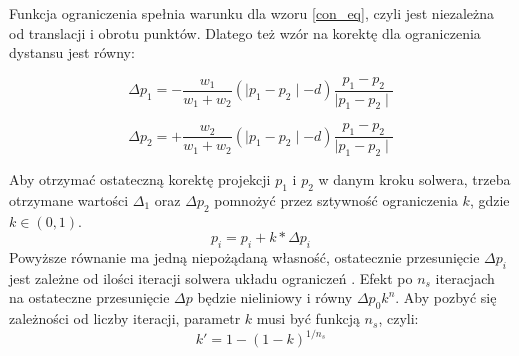 Funkcja ograniczenia spełnia warunku dla wzoru \ref{con_eq}, czyli jest
niezależna od translacji i obrotu punktów. Dlatego też wzór na korektę dla
ograniczenia dystansu jest równy:

$$\Delta p_1 = - \frac{w_1}{w_1 + w_2} (\mid p_1 - p_2 \mid - d)\frac{p_1 -
	p_2}{\mid p_1 - p_2 \mid}$$

$$\Delta p_2 = + \frac{w_2}{w_1 + w_2} (\mid p_1 - p_2 \mid - d)\frac{p_1 -
	p_2}{\mid p_1 - p_2 \mid}$$

Aby otrzymać ostateczną korektę projekcji $p_1$ i $p_2$ w danym kroku solwera,
	trzeba otrzymane wartości $\Delta _1$ oraz $\Delta p_2$ pomnożyć przez
	sztywność ograniczenia $k$, gdzie $k \in (0, 1)$. 
	$$ p_i = p_i + k * \Delta p_i$$
	Powyższe równanie ma jedną niepożądaną własność, ostatecznie przesunięcie
	$\Delta p_i$ jest zależne od ilości iteracji solwera układu ograniczeń
	. Efekt po $n_s$ iteracjach na ostateczne przesunięcie $\Delta p$
	będzie nieliniowy i równy $\Delta p_0 k^n$. Aby pozbyć się zależności od
	liczby iteracji, parametr $k$ musi być funkcją $n_s$, czyli:
	$$ k' = 1 - (1 - k)^{1/n_s}$$

